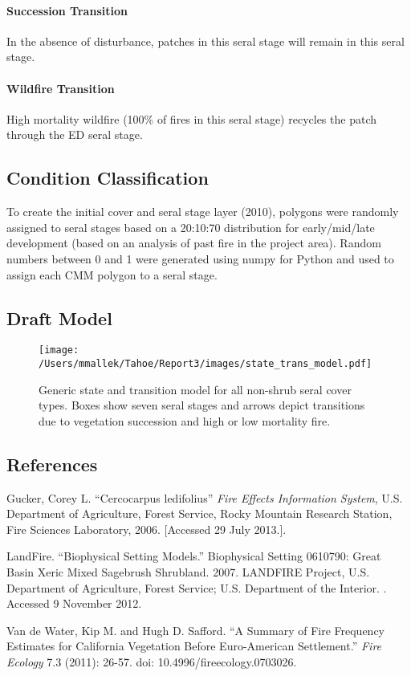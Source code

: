 \paragraph{Succession Transition} In the absence of disturbance, patches in this seral stage will remain in this seral stage. 

\paragraph{Wildfire Transition} High mortality wildfire (100\% of fires in this seral stage) recycles the patch through the ED seral stage.

\noindent\hrulefill

\subsection*{Condition Classification}
To create the initial cover and seral stage layer (2010), polygons were randomly assigned to seral stages based on a 20:10:70 distribution for early/mid/late development (based on an analysis of past fire in the project area). Random numbers between 0 and 1 were generated using numpy for Python and used to assign each CMM polygon to a seral stage.

\subsection*{Draft Model}
\begin{figure}[htbp]
\centering
\texttt{[image: /Users/mmallek/Tahoe/Report3/images/state\_trans\_model.pdf]}
\caption{Generic state and transition model for all non-shrub seral cover types. Boxes show seven seral stages and arrows depict transitions due to vegetation succession and high or low mortality fire.} 
\label{cmm_transmodel}
\end{figure}

\clearpage
\subsection*{References}
\begin{hangparas}{.25in}{1} Gucker, Corey L. ``Cercocarpus ledifolius'' \emph{Fire Effects Information System}, U.S. Department of Agriculture, Forest Service, Rocky Mountain Research Station, Fire Sciences Laboratory, 2006.   [Accessed 29 July 2013.]. 

LandFire. ``Biophysical Setting Models.'' Biophysical Setting 0610790: Great Basin Xeric Mixed Sagebrush Shrubland. 2007. LANDFIRE Project, U.S. Department of Agriculture, Forest Service; U.S. Department of the Interior. . Accessed 9 November 2012.

Van de Water, Kip M. and Hugh D. Safford. ``A Summary of Fire Frequency Estimates for California Vegetation Before Euro-American Settlement.'' \emph{Fire Ecology} 7.3 (2011): 26-57. doi: 10.4996/fireecology.0703026.

\end{hangparas}

